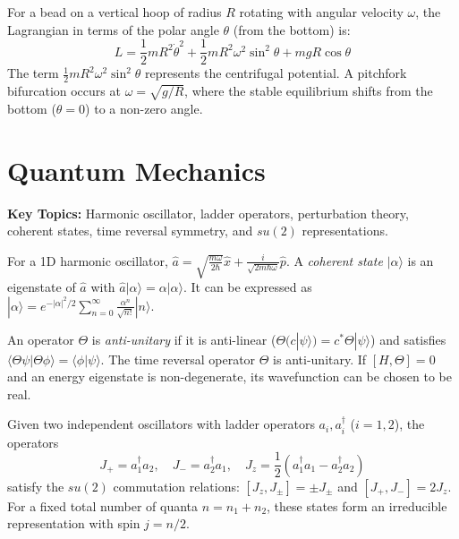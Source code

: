\begin{example}
For a bead on a vertical hoop of radius $R$ rotating with angular velocity $\omega$, the Lagrangian in terms of the polar angle $\theta$ (from the bottom) is:
\[ L = \frac{1}{2}mR^2 \dot{\theta}^2 + \frac{1}{2}mR^2 \omega^2 \sin^2 \theta + mgR \cos \theta \]
The term $\frac{1}{2}mR^2 \omega^2 \sin^2 \theta$ represents the centrifugal potential. A pitchfork bifurcation occurs at $\omega = \sqrt{g/R}$, where the stable equilibrium shifts from the bottom ($\theta=0$) to a non-zero angle.
\end{example}

\section{Quantum Mechanics}

\textbf{Key Topics:} Harmonic oscillator, ladder operators, perturbation theory, coherent states, time reversal symmetry, and $su(2)$ representations.

\begin{definition}
For a 1D harmonic oscillator, $\hat{a} = \sqrt{\frac{m\omega}{2\hbar}} \hat{x} + \frac{i}{\sqrt{2m\hbar\omega}} \hat{p}$. A \emph{coherent state} $|\alpha\rangle$ is an eigenstate of $\hat{a}$ with $\hat{a}|\alpha\rangle = \alpha|\alpha\rangle$. It can be expressed as $|\alpha\rangle = e^{-|\alpha|^2/2} \sum_{n=0}^\infty \frac{\alpha^n}{\sqrt{n!}} |n\rangle$.
\end{definition}

\begin{definition}
An operator $\Theta$ is \emph{anti-unitary} if it is anti-linear ($\Theta(c|\psi\rangle) = c^* \Theta|\psi\rangle$) and satisfies $\langle \Theta \psi | \Theta \phi \rangle = \langle \phi | \psi \rangle$. The time reversal operator $\Theta$ is anti-unitary. If $[H, \Theta] = 0$ and an energy eigenstate is non-degenerate, its wavefunction can be chosen to be real.
\end{definition}

\begin{theorem}
Given two independent oscillators with ladder operators $a_i, a_i^\dagger$ ($i=1,2$), the operators
\[ J_+ = a_1^\dagger a_2, \quad J_- = a_2^\dagger a_1, \quad J_z = \frac{1}{2}(a_1^\dagger a_1 - a_2^\dagger a_2) \]
satisfy the $su(2)$ commutation relations: $[J_z, J_\pm] = \pm J_\pm$ and $[J_+, J_-] = 2J_z$. For a fixed total number of quanta $n = n_1 + n_2$, these states form an irreducible representation with spin $j = n/2$.
\end{theorem}

